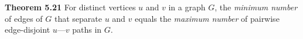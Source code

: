 \nopagenumbers
{\bf Theorem 5.21}
\vskip 6pt
For distinct vertices $u$ and $v$ in a graph $G$, the {\it minimum number} of edges of $G$ that separate $u$ and $v$ equals the {\it maximum number} of pairwise edge-disjoint $u$---$v$ paths in $G$.

\vfill\eject
